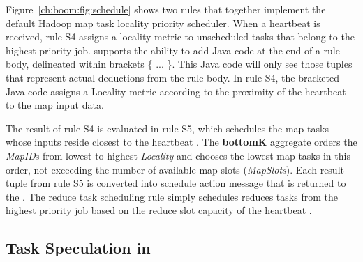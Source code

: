 Figure~\ref{ch:boom:fig:schedule} shows two rules that together implement the default Hadoop map task locality priority scheduler.
When a \TT heartbeat is received, rule S4 assigns a locality metric to unscheduled tasks that belong to the highest priority job. \JOL
supports the ability to add Java code at the end of a rule body, delineated within brackets \{ ... \}. This Java code will only see
those tuples that represent actual deductions from the rule body. In rule S4, the bracketed Java code assigns a Locality metric 
according to the proximity of the heartbeat \TT to the map input data.

The result of rule S4 is evaluated in rule S5, which schedules the map tasks whose inputs reside closest to 
the heartbeat \TT. The {\bf bottomK} aggregate orders the {\em MapID}s from lowest to highest {\em Locality} and 
chooses the lowest map tasks in this order, not exceeding the number of available map slots ({\em MapSlots}). Each result 
tuple from rule S5 is converted into schedule action message that is returned to the \TT. The reduce task scheduling 
rule simply schedules reduces tasks from the highest priority job based on the reduce slot capacity of the heartbeat \TT. 

\subsection{Task Speculation in \OVERLOG}

